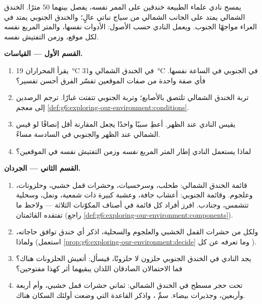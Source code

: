 \begin{problem}\label{pb:g6:exploring-our-environment:1}
يمسح نادي علماء الطبيعة خندقين على الممر نفسه، يفصل بينهما $50$
مترًا. الخندق الشمالي يمتد على الجانب الشمالي من سياج نباتي عالٍ؛
والخندق الجنوبي يمتد في العراء مواجهًا الجنوب. ويعمل النادي حسب
الأصول: الأدوات نفسها، والمتر المربع نفسه لكل موقع، وزمن التفتيش
نفسه.

\medskip\noindent\textbf{القسم الأول --- القياسات.}
\begin{enumerate}
  \item يقرأ المحراران \qty{19}{\degreeCelsius} في الخندق الشمالي
        و\qty{31}{\degreeCelsius} في الجنوبي في الساعة نفسها. فأي
        صفة واحدة من صفات الموقعين تفسّر الفرق أحسن تفسير؟
  \item تربة الخندق الشمالي تلتصق بالأصابع؛ وتربة الجنوبي تتفتت
        غبارًا. ترجم الرصدين إلى معجم
        \cref{def:g6:exploring-our-environment:conditions}.
  \item يقيس النادي عند الظهر. أعطِ سببًا واحدًا يجعل المقارنة أقل
        إنصافًا لو قيس الشمالي عند الظهر والجنوبي في السادسة
        مساءً.
  \item لماذا يستعمل النادي إطار المتر المربع \emph{نفسه} وزمن
        التفتيش نفسه في الموقعين؟
\end{enumerate}

\medskip\noindent\textbf{القسم الثاني --- الجردان.}
\begin{enumerate}[resume]
  \item قائمة الخندق الشمالي: طحلب، وسرخسيات، وحشرات قمل خشبي،
        وحلزونات، وعلجوم. وقائمة الجنوبي: أعشاب جافة، وعشبة كبيرة
        ذات  شمعية، ونمل، وسحلية تتشمس، وجنادب. افرز أفراد
        كل قائمة في أصناف المكوّنات الثلاثة --- ولاحظ ما تفتقده
        القائمتان (راجع
        \cref{def:g6:exploring-our-environment:components}).
  \item ولكل من حشرات القمل الخشبي والعلجوم والسحلية، اذكر 
        أي خندق توافق حاجاته، ولماذا (استعمل
        \cref{prop:g6:exploring-our-environment:decide} وما تعرفه
        عن كل ).
  \item يجد النادي في الخندق الجنوبي  حلزون لا حلزونًا،
        فيسأل: أتعيش الحلزونات هناك؟ فما الاحتمالان الصادقان
        اللذان يبقيهما أثر كهذا مفتوحين؟
  \item تحت حجر مسطح في الخندق الشمالي: ثماني حشرات قمل خشبي،
        وأم أربعة وأربعين، وجذيرات بيضاء. سمِّ  ، واذكر القاعدة التي وضعت أولئك السكان هناك.
\end{enumerate}


\end{problem}
